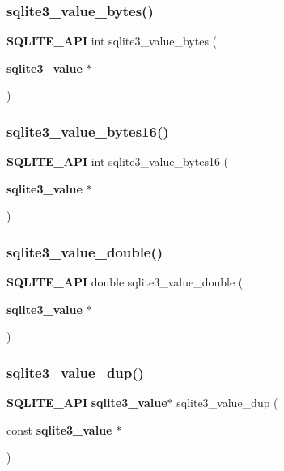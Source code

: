 \subsubsection{sqlite3\_value\_bytes()}
{\footnotesize\ttfamily \textbf{ S\+Q\+L\+I\+T\+E\+\_\+\+A\+PI} int sqlite3\+\_\+value\+\_\+bytes (\begin{DoxyParamCaption}\item[{\textbf{ sqlite3\+\_\+value} $\ast$}]{ }\end{DoxyParamCaption})}

\mbox{\label{sqlite3_8h_a71c25f7d8ae1cedf94aa4b09d9ff6de2}} 
\subsubsection{sqlite3\_value\_bytes16()}
{\footnotesize\ttfamily \textbf{ S\+Q\+L\+I\+T\+E\+\_\+\+A\+PI} int sqlite3\+\_\+value\+\_\+bytes16 (\begin{DoxyParamCaption}\item[{\textbf{ sqlite3\+\_\+value} $\ast$}]{ }\end{DoxyParamCaption})}

\mbox{\label{sqlite3_8h_a3e50c1a2dd484a8b6911c9d163816b88}} 
\subsubsection{sqlite3\_value\_double()}
{\footnotesize\ttfamily \textbf{ S\+Q\+L\+I\+T\+E\+\_\+\+A\+PI} double sqlite3\+\_\+value\+\_\+double (\begin{DoxyParamCaption}\item[{\textbf{ sqlite3\+\_\+value} $\ast$}]{ }\end{DoxyParamCaption})}

\mbox{\label{sqlite3_8h_a909968ac2ab8f2b19189db5fd649e851}} 
\subsubsection{sqlite3\_value\_dup()}
{\footnotesize\ttfamily \textbf{ S\+Q\+L\+I\+T\+E\+\_\+\+A\+PI} \textbf{ sqlite3\+\_\+value}$\ast$ sqlite3\+\_\+value\+\_\+dup (\begin{DoxyParamCaption}\item[{const \textbf{ sqlite3\+\_\+value} $\ast$}]{ }\end{DoxyParamCaption})}

